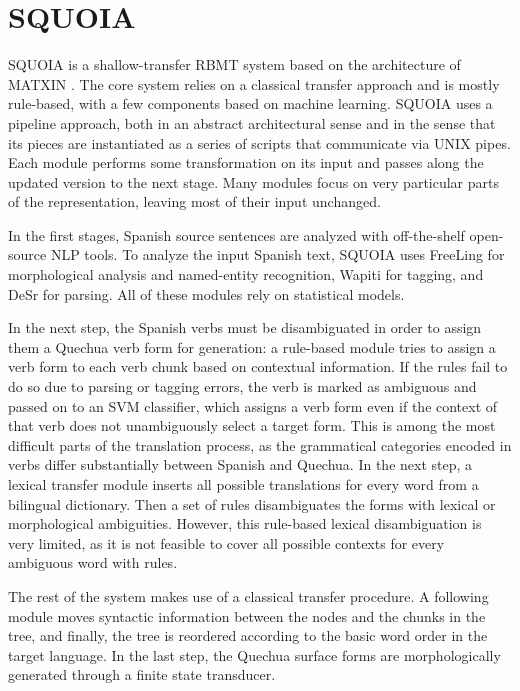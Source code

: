\documentclass[10pt, a4paper]{article}
\begin{document}
\section{SQUOIA}
SQUOIA is a shallow-transfer RBMT system based on the
architecture of MATXIN \cite{matxin_2005,matxin}.
The core system relies on a classical transfer approach and is mostly
rule-based, with a few components based on machine learning.
SQUOIA uses a pipeline approach, both in an abstract architectural sense and in
the sense that its pieces are instantiated as a series of scripts that communicate
via UNIX pipes. Each module performs some transformation on its input and
passes along the updated version to the next stage. Many modules focus on very
particular parts of the representation, leaving most of their input unchanged.

In the first stages, Spanish source sentences are analyzed with off-the-shelf
open-source NLP tools. To analyze the input Spanish text,
SQUOIA uses FreeLing \cite{padro12} for morphological analysis and named-entity
recognition,
Wapiti \cite{lavergne2010practical} for tagging,
and DeSr \cite{attardi-EtAl:2007:EMNLP-CoNLL2007} for parsing.
All of these modules rely on statistical models.

In the next step, the Spanish verbs must be disambiguated in order to assign
them a Quechua verb form for generation: a rule-based module tries to assign a
verb form to each verb chunk based on contextual information. If the rules fail to
do so due to parsing or tagging errors, the verb is marked as ambiguous and
passed on to an SVM classifier, which assigns a verb form even if the context
of that verb does not unambiguously select a target form. This is among the
most difficult parts of the
translation process, as the grammatical categories encoded in verbs differ
substantially between Spanish and Quechua. In the next step, a lexical transfer
module inserts all possible translations for every word from a bilingual dictionary.
Then a set of rules disambiguates the forms with lexical or morphological
ambiguities. However, this rule-based lexical disambiguation is very limited,
as it is not feasible to cover all possible contexts for every ambiguous word
with rules.

The rest of the system makes use of a classical transfer procedure. A following module
moves syntactic information between the nodes and the chunks in the tree, and
finally, the tree is reordered according to the basic word order in the target
language. In the last step, the Quechua surface forms are morphologically
generated through a finite state transducer.
\end{document}
